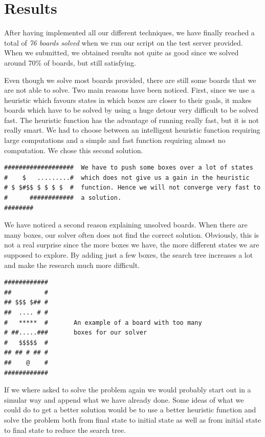 \documentclass[a4paper,10pt]{article}
\begin{document}

\newpage
\section{Results}
After having implemented all our different techniques, we have finally reached a total of \emph{76 boards solved} when we run our script on the test server provided. When we submitted, we obtained results not quite as good since we solved around 70\% of boards, but still satisfying.



Even though we solve most boards provided, there are still some boards that we are not able to solve. Two main reasons have been noticed. First, since we use a heuristic which favours states in which boxes are closer to their goals, it makes boards which have to be solved by using a huge detour very difficult to be solved fast. The heuristic function has the advantage of running really fast, but it is not really smart. 
We had to choose between an intelligent heuristic function requiring large computations and a simple and fast function requiring almost no computation. We chose this second solution.
\begin{verbatim}
###################  We have to push some boxes over a lot of states
#    $   .........#  which does not give us a gain in the heuristic
# $ $#$$ $ $ $ $  #  function. Hence we will not converge very fast to
#      ############  a solution.
########
\end{verbatim}


We have noticed a second reason explaining unsolved boards. When there are many boxes, our solver often does not find the correct solution. Obviously, this is not a real surprise since the more boxes we have, the more different states we are supposed to explore. By adding just a few boxes, the search tree increases a lot and make the research much more difficult.

\begin{verbatim}
############
##         #
## $$$ $## #
##  .... # #
#   *****  #       An example of a board with too many
# ##.....###       boxes for our solver
#   $$$$$  #
## ## # ## #
##    @    #
############
\end{verbatim}

If we where asked to solve the problem again we would probably start out in a simular way
and append what we have already done.  Some ideas of what we could do to get a better solution
would be to use a better heuristic function and solve the problem both from final state to initial state
as well as from initial state to final state to reduce the search tree.

   
      
 
 
	
\end{document}
